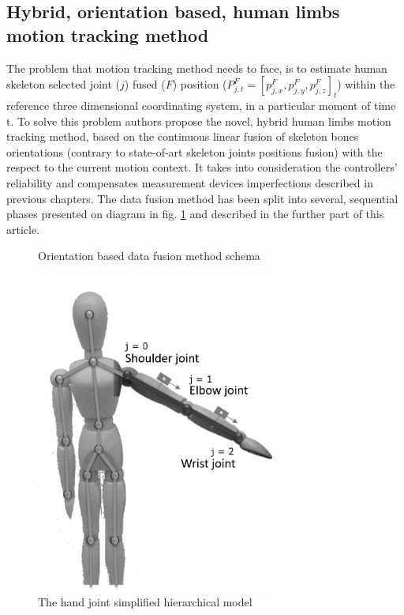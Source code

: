 \documentclass[sensors,article,submit,moreauthors,pdftex,10pt,a4paper]{mdpi}
\begin{document}
	\subsection{Hybrid, orientation based, human limbs motion tracking method}
	The problem that motion tracking method needs to face, is to estimate human skeleton selected joint ($j$) fused ($F$) position ($P^F_{j,t} = [p^F_{j,x}, p^F_{j,y}, p^F_{j,z}]_t$) within the reference three dimensional coordinating system, in a particular moment of time t. To solve this problem authors propose the novel, hybrid human limbs motion tracking method, based on the continuous linear fusion of skeleton bones orientations (contrary to state-of-art skeleton joints positions fusion) with the respect to the current motion context. It takes into consideration the controllers’ reliability and compensates measurement devices imperfections described in previous chapters. The data fusion method has been split into several, sequential phases presented on diagram in fig. \ref{fig:methodPhases} and described in the further part of this article. 
		
	\begin{minipage}{\linewidth}
		\centering
		\begin{minipage}[b]{0.45\linewidth}
			\begin{figure}[H] %
				\scalebox{0.47}{
					
				}
				\caption{Orientation based data fusion method schema}
				\label{fig:methodPhases}
			\end{figure}
		\end{minipage}
		\hfill
		\begin{minipage}[b]{0.45\linewidth}
			\begin{figure}[H] %
				\includegraphics[width=0.7\textwidth]{Figure9.png}
				\caption{The hand joint simplified hierarchical model}		
				\label{fig:hybrid:jointsHierarchy}	
			\end{figure}
		\end{minipage}
	\end{minipage}
		
\end{document}
